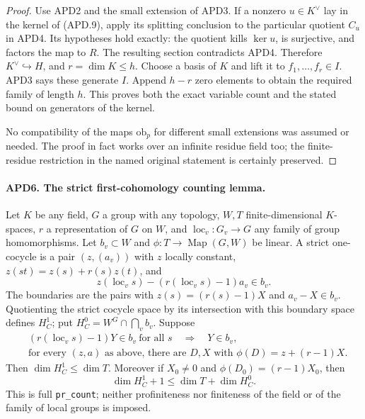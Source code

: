 \begin{proof}
Use APD2 and the small extension of APD3.  If a nonzero
\(u\in K^\vee\) lay in the kernel of (APD.9), apply its
splitting conclusion to the particular quotient \(C_u\) in
APD4.  Its hypotheses hold exactly: the quotient kills
\(\ker u\), is surjective, and factors the map to \(R\).
The resulting section contradicts APD4.  Therefore
\(K^\vee\hookrightarrow H\), and
\(r=\dim K\le h\).  Choose a basis of \(K\) and lift it
to \(f_1,\ldots,f_r\in I\).  APD3 says these generate
\(I\).  Append \(h-r\) zero elements to obtain the required
family of length \(h\).  This proves both the exact variable
count and the stated bound on generators of the kernel.

No compatibility of the maps \(\mathrm{ob}_p\) for different
small extensions was assumed or needed.  The proof in fact works
over an infinite residue field too; the finite-residue restriction
in the named original statement is certainly preserved.
\end{proof}

\paragraph{APD6. The strict first-cohomology counting lemma.}
\label{claim:APD6}
Let \(K\) be any field, \(G\) a group with any topology,
\(W,T\) finite-dimensional \(K\)-spaces, \(r\) a
representation of \(G\) on \(W\), and
\(\operatorname{loc}_v:G_v\to G\) any family of group
homomorphisms.  Let \(b_v\subset W\) and
\(\phi:T\to\operatorname{Map}(G,W)\) be linear.  A strict
one-cocycle is a pair \((z,(a_v))\) with \(z\) locally
constant, \(z(st)=z(s)+r(s)z(t)\), and
\[
 z(\operatorname{loc}_v s)-(r(\operatorname{loc}_v s)-1)a_v
                                                        \in b_v.
                                                               \tag{APD.11}
\]
The boundaries are the pairs with \(z(s)=(r(s)-1)X\) and
\(a_v-X\in b_v\).  Quotienting the strict cocycle space by
its intersection with this boundary space defines \(H^1_C\); put
\(H^0_C=W^G\cap\bigcap_v b_v\).
Suppose
\[
 \begin{split}
 &(r(\operatorname{loc}_v s)-1)Y\in b_v\ \text{for all }s
                         \quad\Longrightarrow\quad Y\in b_v,\\
 &\text{for every }(z,a)\text{ as above, there are }D,X
        \text{ with }\phi(D)=z+(r-1)X.
 \end{split}                                                  \tag{APD.12}
\]
Then \(\dim H^1_C\le\dim T\).  Moreover if
\(X_0\ne0\) and \(\phi(D_0)=(r-1)X_0\), then
\[
           \dim H^1_C+1\le\dim T+\dim H^0_C.                 \tag{APD.13}
\]
This is full \texttt{pr\_count}; neither profiniteness nor
finiteness of the field or of the family of local groups is imposed.

